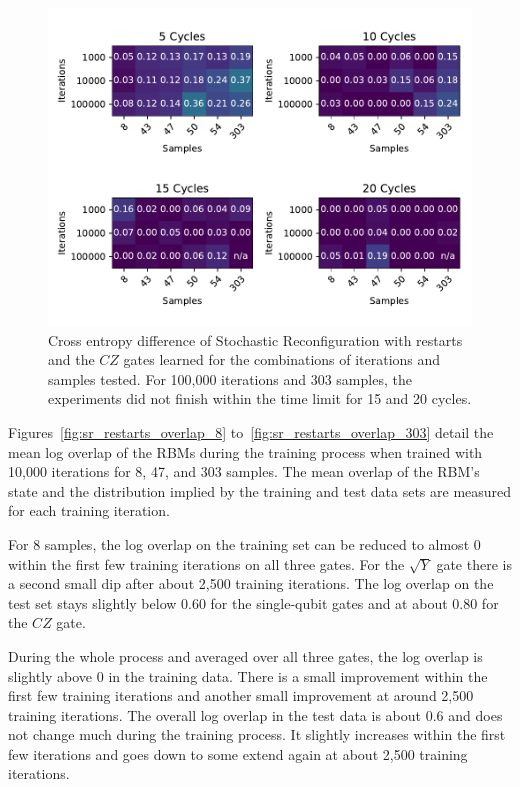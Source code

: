 \begin{figure}[H]
  \centering
  \includegraphics[width=\textwidth]{figures/results/SR-restarts-learned/fxeb_heatmap.pdf}
  \caption[Cross entropy difference of Stochastic Reconfiguration with restarts learned]{Cross entropy difference of Stochastic 
  Reconfiguration with restarts and the $CZ$ gates learned for the combinations of iterations and samples tested.
  For 100,000 iterations and 303 samples, the experiments did not finish within the time limit for 15 and 20 cycles.}
  \label{fig:sr_restarts_fxeb}
\end{figure}

Figures~\ref{fig:sr_restarts_overlap_8} to~\ref{fig:sr_restarts_overlap_303} detail the mean log overlap of the RBMs during the 
training process when trained with 10,000 iterations for 8, 47, and 303 samples. The 
mean overlap of the RBM's state and the distribution implied by the training and test data sets are measured 
for each training iteration.

For 8 samples, the log overlap on the training set can be reduced to almost 0 within the first few training iterations 
on all three gates. For the $\sqrt{Y}$ gate there is a second small dip after about 2,500 training iterations. 
The log overlap on the test set stays slightly below $0.60$ for the single-qubit gates and at about $0.80$ for the 
$CZ$ gate. 

During the whole process and averaged over all three gates, the log overlap is slightly above $0$ in the training data. There is a small 
improvement within the first few training iterations and another small improvement at around 2,500 training iterations. 
The overall log overlap in the test data is about $0.6$ and does not change much during the training process. It 
slightly increases within the first few iterations and goes down to some extend again at about 2,500 training iterations.

